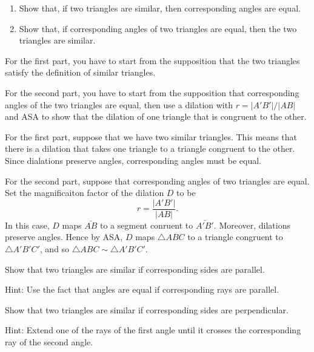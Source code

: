 \documentclass{ximera}
\begin{document}
\begin{question}\hfil
\begin{enumerate}
\item Show that, if two triangles are similar, then corresponding
angles are equal.

\item Show that, if corresponding angles of two triangles are equal, then the two
triangles are similar.
\end{enumerate}

\begin{solution}
\begin{hint}
For the first part, you have to start from the supposition that the
two triangles satisfy the definition of similar triangles.
\end{hint}
\begin{hint}
For the second part, you have to start from the supposition that
corresponding angles of the two triangles are equal, then use a
dilation with $r=|A'B'|/|AB|$ and ASA to show that the dilation of one
triangle that is congruent to the other.
\end{hint}
For the first part, suppose that we have two similar triangles. This
means that there is a dilation that takes one triangle to a triangle
congruent to the other. Since dialations preserve angles,
corresponding angles must be equal.

For the second part, suppose that corresponding angles of two
triangles are equal. Set the magnificaiton factor of the dilation $D$
to be
\[
r = \frac{|A'B'|}{|AB|}.
\]
In this case, $D$ maps $\bar{AB}$ to a segment conruent to
$\bar{A'B'}$. Moreover, dilations preserve angles. Hence by ASA, $D$
maps $\triangle ABC$ to a triangle congruent to $\triangle A'B'C'$,
and so $\triangle ABC \sim \triangle A'B'C'$.
\end{solution}
\end{question}

\begin{question}
\label{39} Show that two triangles are similar if corresponding
sides are parallel.

Hint: Use the fact that angles are equal if corresponding rays are
parallel.
\end{question}

\begin{question}
Show that two triangles are similar if corresponding sides are perpendicular.

Hint: Extend one of the rays of the first angle until it crosses the
corresponding ray of the second angle.
\end{question}
\end{document}
